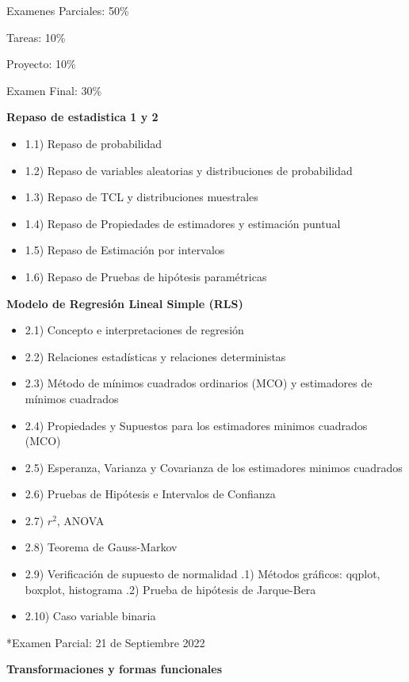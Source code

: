 \documentclass{../oxmathproblems}
\begin{document}
Examenes Parciales: 50\%

Tareas: 10\% 

Proyecto: 10\%

Examen Final: 30\%

\begin{questions}

\miquestion \textbf{Repaso de estadistica 1 y 2}

\begin{itemize}
\item 1.1) Repaso de probabilidad
\item 1.2) Repaso de variables aleatorias y distribuciones de probabilidad
\item 1.3) Repaso de TCL y distribuciones muestrales
\item 1.4) Repaso de Propiedades de estimadores y estimación puntual
\item 1.5) Repaso de Estimación por intervalos
\item 1.6) Repaso de Pruebas de hipótesis paramétricas
\end{itemize}

\miquestion \textbf{Modelo de Regresión Lineal Simple (RLS)}

\begin{itemize}
\item 2.1) Concepto e interpretaciones de regresión 
\item 2.2) Relaciones estadísticas y relaciones deterministas
\item 2.3) Método de mínimos cuadrados ordinarios (MCO) y estimadores de mínimos cuadrados
\item 2.4) Propiedades y Supuestos para los estimadores minimos cuadrados (MCO)
\item 2.5) Esperanza, Varianza y Covarianza de los estimadores minimos cuadrados
\item 2.6) Pruebas de Hipótesis e Intervalos de Confianza 
\item 2.7) $r^2$, ANOVA
\item 2.8) Teorema de Gauss-Markov
\item 2.9) Verificación de supuesto de normalidad
.1) Métodos gráficos: qqplot, boxplot, histograma
.2) Prueba de hipótesis de Jarque-Bera
\item 2.10) Caso variable binaria
\end{itemize}
*Examen Parcial: 21 de Septiembre 2022

\miquestion \textbf{Transformaciones y formas funcionales}


\end{questions}
\end{document}
